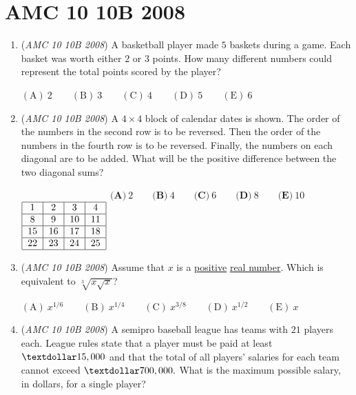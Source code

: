 \section{AMC 10 10B 2008}
        \begin{enumerate}
        	\item (\textit{AMC 10 10B 2008}) A basketball player made $5$ baskets during a game. Each basket was worth either $2$ or $3$ points. How many different numbers could represent the total points scored by the player?


 $\mathrm{(A)}\ 2\qquad\mathrm{(B)}\ 3\qquad\mathrm{(C)}\ 4\qquad\mathrm{(D)}\ 5\qquad\mathrm{(E)}\ 6$


	\item (\textit{AMC 10 10B 2008}) A $4\times 4$ block of calendar dates is shown. The order of the numbers in the second row is to be reversed. Then the order of the numbers in the fourth row is to be reversed. Finally, the numbers on each diagonal are to be added. What will be the positive difference between the two diagonal sums?


 $\begin{tabular}[t]{|c|c|c|c|} \multicolumn{4}{c}{}\\\hline 1&2&3&4\\\hline 8&9&10&11\\\hline 15&16&17&18\\\hline 22&23&24&25\\\hline \end{tabular}$
$\textbf{(A)}\ 2 \qquad \textbf{(B)}\ 4 \qquad \textbf{(C)}\ 6 \qquad \textbf{(D)}\ 8 \qquad \textbf{(E)}\ 10$


	\item (\textit{AMC 10 10B 2008}) Assume that $x$ is a \href{https://artofproblemsolving.com/wiki/index.php?title=Positive}{positive} \href{https://artofproblemsolving.com/wiki/index.php?title=Real\_number}{real number}. Which is equivalent to $\sqrt[3]{x\sqrt{x}}$?


 $\mathrm{(A)}\ x^{1/6}\qquad\mathrm{(B)}\ x^{1/4}\qquad\mathrm{(C)}\ x^{3/8}\qquad\mathrm{(D)}\ x^{1/2}\qquad\mathrm{(E)}\ x$


	\item (\textit{AMC 10 10B 2008}) A semipro baseball league has teams with $21$ players each. League rules state that a player must be paid at least $\textdollar 15,000$ and that the total of all players' salaries for each team cannot exceed $\textdollar 700,000.$ What is the maximum possible salary, in dollars, for a single player?



\end{enumerate}
